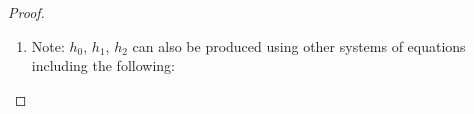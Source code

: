\begin{proof}
\begin{enumerate}
  \item Note: $h_0$, $h_1$, $h_2$ can also be produced using other systems of equations including the following:
\end{enumerate}
\end{proof}

%
%

